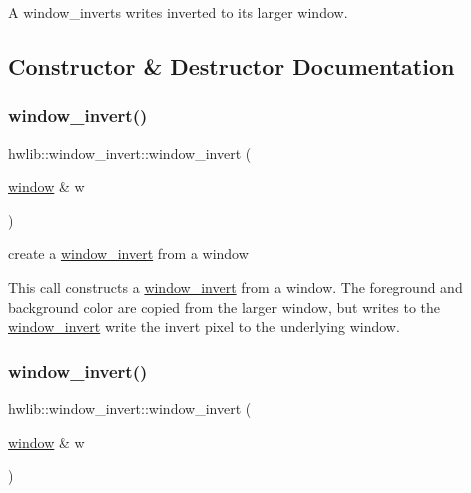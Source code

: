 A window\+\_\+inverts writes inverted to its larger window. 

\subsection{Constructor \& Destructor Documentation}
\mbox{\label{classhwlib_1_1window__invert_a2ee672d63f206e7e90558783f071d98a}} 
\subsubsection{\texorpdfstring{window\+\_\+invert()}{window\_invert()}\hspace{0.1cm}{\footnotesize\ttfamily [1/2]}}
{\footnotesize\ttfamily hwlib\+::window\+\_\+invert\+::window\+\_\+invert (\begin{DoxyParamCaption}\item[{\hyperlink{classhwlib_1_1window}{window} \&}]{w }\end{DoxyParamCaption})\hspace{0.3cm}{\ttfamily [inline]}}



create a \hyperlink{classhwlib_1_1window__invert}{window\+\_\+invert} from a window 

This call constructs a \hyperlink{classhwlib_1_1window__invert}{window\+\_\+invert} from a window. The foreground and background color are copied from the larger window, but writes to the \hyperlink{classhwlib_1_1window__invert}{window\+\_\+invert} write the invert pixel to the underlying window. \mbox{\label{classhwlib_1_1window__invert_a2ee672d63f206e7e90558783f071d98a}} 
\subsubsection{\texorpdfstring{window\+\_\+invert()}{window\_invert()}\hspace{0.1cm}{\footnotesize\ttfamily [2/2]}}
{\footnotesize\ttfamily hwlib\+::window\+\_\+invert\+::window\+\_\+invert (\begin{DoxyParamCaption}\item[{\hyperlink{classhwlib_1_1window}{window} \&}]{w }\end{DoxyParamCaption})\hspace{0.3cm}{\ttfamily [inline]}}

